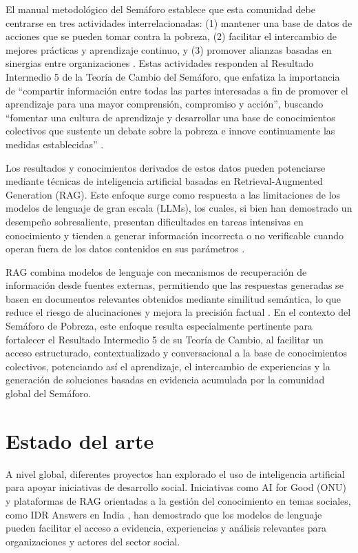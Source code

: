 \documentclass{article}
\begin{document}
El manual metodológico del Semáforo establece que esta comunidad debe centrarse en tres actividades interrelacionadas: (1) mantener una base de datos de acciones que se pueden tomar contra la pobreza, (2) facilitar el intercambio de mejores prácticas y aprendizaje continuo, y (3) promover alianzas basadas en sinergias entre organizaciones \cite[p.~14-15]{ManualSemaforo2023}. Estas actividades responden al Resultado Intermedio 5 de la Teoría de Cambio del Semáforo, que enfatiza la importancia de ``compartir información entre todas las partes interesadas a fin de promover el aprendizaje para una mayor comprensión, compromiso y acción'', buscando ``fomentar una cultura de aprendizaje y desarrollar una base de conocimientos colectivos que sustente un debate sobre la pobreza e innove continuamente las medidas establecidas'' \cite[p.~11]{ManualSemaforo2023}.

Los resultados y conocimientos derivados de estos datos pueden potenciarse mediante técnicas de inteligencia artificial basadas en Retrieval-Augmented Generation (RAG). Este enfoque surge como respuesta a las limitaciones de los modelos de lenguaje de gran escala (LLMs), los cuales, si bien han demostrado un desempeño sobresaliente, presentan dificultades en tareas intensivas en conocimiento y tienden a generar información incorrecta o no verificable cuando operan fuera de los datos contenidos en sus parámetros \cite{Lewis2020RAG}. 

RAG combina modelos de lenguaje con mecanismos de recuperación de información desde fuentes externas, permitiendo que las respuestas generadas se basen en documentos relevantes obtenidos mediante similitud semántica, lo que reduce el riesgo de alucinaciones y mejora la precisión factual \cite{Lewis2020RAG}. En el contexto del Semáforo de Pobreza, este enfoque resulta especialmente pertinente para fortalecer el Resultado Intermedio 5 de su Teoría de Cambio, al facilitar un acceso estructurado, contextualizado y conversacional a la base de conocimientos colectivos, potenciando así el aprendizaje, el intercambio de experiencias y la generación de soluciones basadas en evidencia acumulada por la comunidad global del Semáforo.

\section{Estado del arte}\label{sec:estadoArte}
A nivel global, diferentes proyectos han explorado el uso de inteligencia artificial para apoyar iniciativas de desarrollo social. Iniciativas como AI for Good (ONU) \cite{itu_aiforgood} y plataformas de RAG orientadas a la gestión del conocimiento en temas sociales, como IDR Answers en India \cite{idr_answers}, han demostrado que los modelos de lenguaje pueden facilitar el acceso a evidencia, experiencias y análisis relevantes para organizaciones y actores del sector social.
\end{document}
